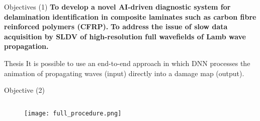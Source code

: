 \documentclass[10pt,aspectratio=169,dvipsnames]{beamer} %
\begin{document}
	\begin{frame}{Objectives (1)}
		\textbf{To develop \textcolor{logoblue}{a novel AI-driven diagnostic system} for delamination identification in composite laminates such as carbon fibre reinforced polymers (CFRP).}
		\vfil
		\textbf{To address the issue of \textcolor{logoblue}{slow data acquisition} by SLDV of high-resolution full wavefields of Lamb wave propagation.}
		\begin{alertblock}{Thesis}
			It is possible to use an end-to-end approach in which DNN 
			processes the animation of propagating waves (input) directly into a damage map (output).
		\end{alertblock}
	\end{frame}
	
	\begin{frame}{Objective (2)}
		\begin{columns}[T]
			\begin{column}[c]{0.95\textwidth}
				\begin{figure}
					\centering
					\texttt{[image: full\_procedure.png]}	
				\end{figure}		
			\end{column}
		\end{columns}		
	\end{frame}
\end{document}
